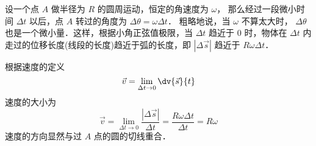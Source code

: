 

设一个点 $A$ 做半径为 $R$ 的圆周运动，恒定的角速度为 $\omega $， 那么经过一段微小时间 $\Delta t$ 以后，点 $A$ 转过的角度为 $\Delta \theta  = \omega \Delta t$． 粗略地说，当 $\omega $ 不算太大时， $\Delta \theta $ 也是一个微小量．这样，根据小角正弦值极限，当 $\Delta t$ 趋近于 $0$ 时，物体在 $\Delta t$ 内走过的位移长度(线段的长度)趋近于弧的长度，即 $\left| {\Delta \vec s} \right|$ 趋近于 $R\omega \Delta t$． 

根据速度的定义 
\begin{equation}
\vec v = \mathop {\lim }\limits_{\Delta t \to 0} \dv{\vec s}{t}
\end{equation}
速度的大小为
\begin{equation}
\vec v = \mathop {\lim }\limits_{\Delta t \to 0} \frac{\left| {\Delta \vec s} \right|}{\Delta t} = \frac{R\omega \Delta t}{\Delta t} = R\omega 
\end{equation}
速度的方向显然与过 $A$ 点的圆的切线重合．











